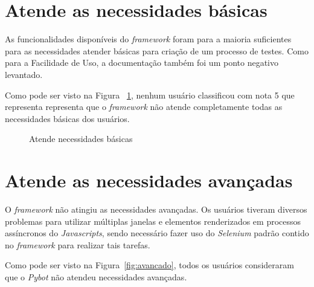     \section{Atende as necessidades básicas}
        As funcionalidades disponíveis do \emph{framework} foram para a maioria suficientes para as necessidades atender básicas para criação de um processo de testes.
        Como para a Facilidade de Uso, a documentação também foi um ponto negativo levantado.

          Como pode ser visto na Figura ~\ref{fig:basico}, nenhum usuário classificou com nota 5 que representa representa que o \emph{framework} não atende completamente
          todas as necessidades básicas dos usuários.

        \begin{figure}[H]
            \vspace*{0,2cm}
            \centering
            \caption{Atende necessidades básicas}
            \label{fig:basico}
        \end{figure}
        \vspace*{-0,9cm}
        {\raggedright {}}

    \section{Atende as necessidades avançadas}
        O \emph{framework} não atingiu as necessidades avançadas. Os usuários tiveram diversos problemas para utilizar múltiplas janelas e elementos renderizados em
        processos assíncronos do \emph{Javascripts}, sendo necessário fazer uso do \emph{Selenium} padrão contido no \emph{framework} para realizar tais tarefas.

          Como pode ser visto na Figura~\ref{fig:avancado}, todos os usuários consideraram que o \emph{Pybot} não atendeu necessidades avançadas.

